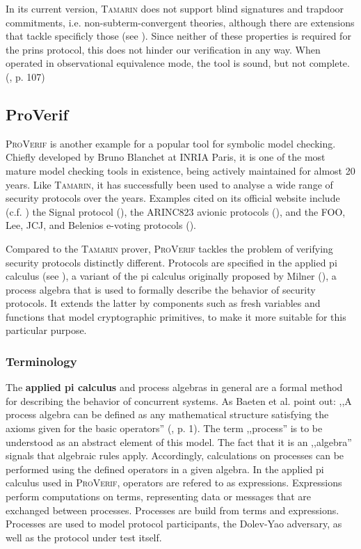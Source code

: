 In its current version, \textsc{Tamarin} does not support blind signatures and trapdoor commitments, i.e. non-subterm-convergent theories, although there are extensions that tackle specificly those (see \cite{dreier2017beyond}).
Since neither of these properties is required for the \gls{prins} protocol, this does not hinder our verification in any way.
When operated in observational equivalence mode, the tool is sound, but not complete. (\cite{tamarin2019manual}, p. 107)

\subsection{ProVerif}
\label{ssec:proverif}

\textsc{ProVerif} is another example for a popular tool for symbolic model checking.
Chiefly developed by Bruno Blanchet at INRIA Paris, it is one of the most mature model checking tools in existence, being actively maintained for almost 20 years.
Like \textsc{Tamarin}, it has successfully been used to analyse a wide range of security protocols over the years.
Examples cited on its official website include (c.f. \cite{proverif}) the Signal protocol (\cite{kobeissi2017automated}), the ARINC823 avionic protocols (\cite{blanchet2017symbolic}), and the FOO, Lee, JCJ, and Belenios e-voting protocols (\cite{hirschi2019improving}).

Compared to the \textsc{Tamarin} prover, \textsc{ProVerif} tackles the problem of verifying security protocols distinctly different.
Protocols are specified in the applied pi calculus (see \cite{abadi2017applied}), a variant of the pi calculus originally proposed by Milner (\cite{milner1999communicating}), a process algebra that is used to formally describe the behavior of security protocols.
It extends the latter by components such as fresh variables and functions that model cryptographic primitives, to make it more suitable for this particular purpose.

\subsubsection{Terminology}

The \textbf{applied pi calculus} and process algebras in general are a formal method for describing the behavior of concurrent systems.
As Baeten et al. point out: ,,A process algebra can be defined as any mathematical structure satisfying the axioms given for the basic operators'' (\cite{baeten2007process}, p. 1).
The term ,,process'' is to be understood as an abstract element of this model.
The fact that it is an ,,algebra'' signals that algebraic rules apply.
Accordingly, calculations on processes can be performed using the defined operators in a given algebra.
In the applied pi calculus used in \textsc{ProVerif}, operators are refered to as expressions.
Expressions perform computations on terms, representing data or messages that are exchanged between processes.
Processes are build from terms and expressions.
Processes are used to model protocol participants, the Dolev-Yao adversary, as well as the protocol under test itself.

